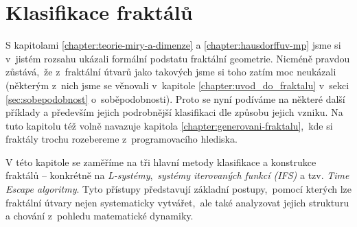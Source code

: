 \chapter{Klasifikace fraktálů}\label{chapter:klasifikace-fraktalu}

S kapitolami \ref{chapter:teorie-miry-a-dimenze} a \ref{chapter:hausdorffuv-mp} jsme si v~jistém rozsahu ukázali formální podstatu fraktální geometrie. Nicméně pravdou zůstává,~že z~fraktální útvarů jako takových jsme si toho zatím moc neukázali (některým z~nich jsme se věnovali v~kapitole \ref{chapter:uvod_do_fraktalu} v~sekci \ref{sec:sobepodobnost} o~soběpodobnosti). Proto se nyní podíváme na některé další příklady a především jejich podrobnější klasifikaci dle způsobu jejich vzniku. Na tuto kapitolu též volně navazuje kapitola \ref{chapter:generovani-fraktalu},~kde si fraktály trochu rozebereme z~programovacího hlediska.

V této kapitole se zaměříme na tři hlavní metody klasifikace a konstrukce fraktálů -- konkrétně na \emph{L-systémy},~\emph{systémy iterovaných funkcí (IFS)} a tzv. \emph{Time Escape algoritmy}. Tyto přístupy představují základní postupy,~pomocí kterých lze fraktální útvary nejen systematicky vytvářet,~ale také analyzovat jejich strukturu a chování z~pohledu matematické dynamiky.



